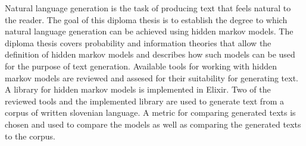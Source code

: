 Natural language generation is the task of producing text that feels natural
to the reader. The goal of this diploma thesis is to establish the degree to
which natural language generation can be achieved using hidden markov models.
The diploma thesis covers probability and information theories that allow the
definition of hidden markov models and describes how such models can be used
for the purpose of text generation. Available tools for working with hidden
markov models are reviewed and assesed for their suitability for generating
text. A library for hidden markov models is implemented in Elixir. Two of the
reviewed tools and the implemented library are used to generate text from a
corpus of written slovenian language. A metric for comparing generated texts
is chosen and used to compare the models as well as comparing the generated
texts to the corpus.
